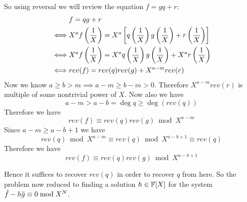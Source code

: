 
So using reversal we will review the equation $f=gq+r$:
\begin{align*}
	& f=qg+r\\
	\iff & X^af\left(\frac1X\right)=X^a\left[q\left(\frac1X\right)g\left(\frac1X\right)+r\left(\frac1X\right)\right]\\
	\iff & X^af\left(\frac1X\right)=X^aq\left(\frac1X\right)g\left(\frac1X\right)+X^ar\left(\frac1X\right)\\
	\iff & rev(f)=rev(q)rev(g)+X^{a-m}rev(r) 
\end{align*}
Now we know $a\geq b>m\implies a-m\geq b-m>0$. Therefore $X^{a-m}rev(r)$ is multiple of some nontrivial power of $X$. Now also we have $$a-m>a-b=\deg q\geq \deg(rev(q))$$ Therefore we have $$rev(f)\equiv rev(q)rev(g)\bmod {X^{a-m}}$$Since $a-m\geq a-b+1$ we have $$rev(q)\bmod {X^{a-m}}\equiv rev(q)\bmod {X^{a-b+1}}\equiv rev(q)$$Therefore we have $$rev(f)\equiv rev(q)rev(g)\bmod {X^{a-b+1}}$$

Hence it suffices to recover $rev(q)$ in order to recover $q$ from here. So the problem now reduced to finding a solution $h\in\mathbb{F}[X]$ for the system $\tilde{f}-h\tilde{g}\equiv 0\bmod{X^N}$.
